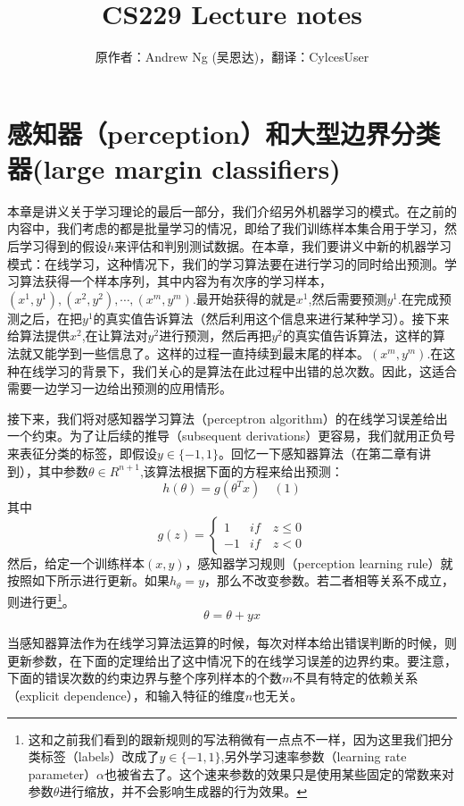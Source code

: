 \documentclass[14pt,a4paper]{article}
\title{CS229 Lecture notes}
\author{原作者：Andrew Ng (吴恩达)，翻译：CylcesUser}
\date{}
\begin{document}
\maketitle

\section{感知器（perception）和大型边界分类器(large margin classifiers)}  

\begin{spacing}{1.25}

\quad \quad 本章是讲义关于学习理论的最后一部分，我们介绍另外机器学习的模式。在之前的内容中，我们考虑的都是批量学习的情况，即给了我们训练样本集合用于学习，然后学习得到的假设$h$来评估和判别测试数据。在本章，我们要讲义中新的机器学习模式：在线学习，这种情况下，我们的学习算法要在进行学习的同时给出预测。学习算法获得一个样本序列，其中内容为有次序的学习样本，$(x^1,y^1),(x^2,y^2),\cdots,(x^m,y^m)$.最开始获得的就是$x^1$,然后需要预测$y^1$.在完成预测之后，在把$y^{1}$的真实值告诉算法（然后利用这个信息来进行某种学习）。接下来给算法提供$x^2$,在让算法对$y^2$进行预测，然后再把$y^2$的真实值告诉算法，这样的算法就又能学到一些信息了。这样的过程一直持续到最末尾的样本。$(x^m,y^m)$.在这种在线学习的背景下，我们关心的是算法在此过程中出错的总次数。因此，这适合需要一边学习一边给出预测的应用情形。

接下来，我们将对感知器学习算法（perceptron algorithm）的在线学习误差给出一个约束。为了让后续的推导（subsequent derivations）更容易，我们就用正负号来表征分类的标签，即假设$y\in\{-1,1\}$。回忆一下感知器算法（在第二章有讲到），其中参数$\theta\in R^{n+1}$,该算法根据下面的方程来给出预测：
$$
h(\theta)=g(\theta^{T}x) \quad(1)
$$
其中
$$
g(z)=\begin{cases}1 & if\quad z\leq 0 \\-1 & if\quad z<0\end{cases}
$$
然后，给定一个训练样本$(x,y)$，感知器学习规则（perception learning rule）就按照如下所示进行更新。如果$h_{\theta}=y$，那么不改变参数。若二者相等关系不成立，则进行更\footnote{这和之前我们看到的跟新规则的写法稍微有一点点不一样，因为这里我们把分类标签（labels）改成了$y\in\{-1,1\}$,另外学习速率参数（learning rate parameter）$\alpha$也被省去了。这个速来参数的效果只是使用某些固定的常数来对参数$\theta$进行缩放，并不会影响生成器的行为效果。}。
$$\theta=\theta+yx$$

当感知器算法作为在线学习算法运算的时候，每次对样本给出错误判断的时候，则更新参数，在下面的定理给出了这中情况下的在线学习误差的边界约束。要注意，下面的错误次数的约束边界与整个序列样本的个数$m$不具有特定的依赖关系（explicit dependence），和输入特征的维度$n$也无关。


\end{spacing}
\end{document}
